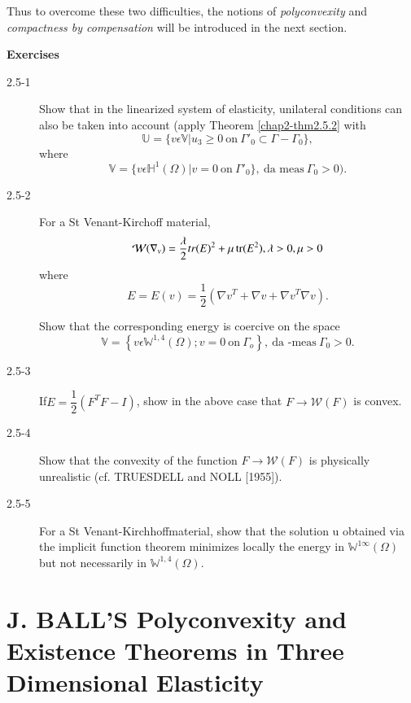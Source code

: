 Thus to overcome these two difficulties, the notions of {\em polyconvexity}
and {\em compactness by compensation} will be introduced in the next
section. 

\medskip
\begin{center}
{\large\bf  Exercises}
\end{center}

\begin{description}
\item[2.5-1] Show that in the linearized system of elasticity,
  unilateral conditions can also be taken into account (apply Theorem
  \ref{chap2-thm2.5.2} with  
$$
  \mathbb{U} = \{v \epsilon \mathbb{V} | u_3 \ge 0 ~\text{on}~
  \Gamma'_0 \subset \Gamma - \Gamma_0\},
$$ 
where
$$
  \mathbb{V} = \{v \epsilon \mathbb{H}^1 (\Omega)| v = 0 ~\text{on}~
  \Gamma'_0 \}, ~\text{da meas}~\Gamma_0 > 0).
$$

\item[2.5-2] For a St Venant-Kirchoff material, 
$$
\mathcal{W}(\nabla_v) = \frac{\lambda}{2} tr(E)^2 + \mu
  \operatorname{tr}(E^2), \lambda > 0, \mu > 0 
$$
where
$$
E = E(v) = \frac{1}{2}(\nabla v^T + \nabla v +
  \nabla v^T \nabla v).
$$

Show that the corresponding energy is coercive on the space
$$
\mathbb{V} = \left\{v \epsilon \mathbb{W}^{1,4}(\Omega); v = 0
~\text{on}~\Gamma_o \right\}, ~\text{da -meas}~ \Gamma_0 > 0. 
$$ 

\item[2.5-3] If\pageoriginale $E = \dfrac{1}{2}(F^T F - I )$, show in the above
  case that $F \rightarrow \mathcal{W}(F)$ is convex. 

\item[2.5-4] Show that the convexity of the function $F \rightarrow
  \mathcal{W}(F)$ is physically unrealistic (cf. TRUESDELL and NOLL
          [1955]). 

\item[2.5-5] For a St Venant-Kirchhoffmaterial, show that the
  solution u obtained via the implicit function theorem minimizes
  locally the energy in $\mathbb{W}^{1 \infty}(\Omega)$ but not
  necessarily in $\mathbb{W}^{1,4}(\Omega)$. 
\end{description}

\section[J. BALL'S Polyconvexity and Existence Theorems.....]{J. BALL'S Polyconvexity and Existence Theorems in Three
  Dimensional Elasticity}\label{chap2-sec2.6}%

